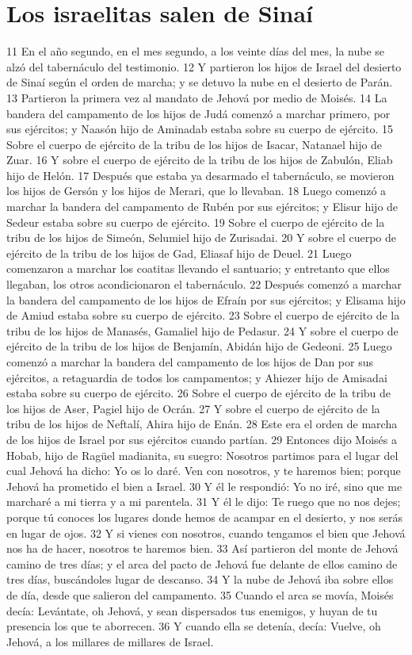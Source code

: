 \section*{Los israelitas salen de Sinaí}

11 En el año segundo, en el mes segundo, a los veinte días del mes, la nube se alzó del tabernáculo del testimonio.
12 Y partieron los hijos de Israel del desierto de Sinaí según el orden de marcha; y se detuvo la nube en el desierto de Parán.
13 Partieron la primera vez al mandato de Jehová por medio de Moisés.
14 La bandera del campamento de los hijos de Judá comenzó a marchar primero, por sus ejércitos; y Naasón hijo de Aminadab estaba sobre su cuerpo de ejército.
15 Sobre el cuerpo de ejército de la tribu de los hijos de Isacar, Natanael hijo de Zuar.
16 Y sobre el cuerpo de ejército de la tribu de los hijos de Zabulón, Eliab hijo de Helón.
17 Después que estaba ya desarmado el tabernáculo, se movieron los hijos de Gersón y los hijos de Merari, que lo llevaban.
18 Luego comenzó a marchar la bandera del campamento de Rubén por sus ejércitos; y Elisur hijo de Sedeur estaba sobre su cuerpo de ejército.
19 Sobre el cuerpo de ejército de la tribu de los hijos de Simeón, Selumiel hijo de Zurisadai.
20 Y sobre el cuerpo de ejército de la tribu de los hijos de Gad, Eliasaf hijo de Deuel.
21 Luego comenzaron a marchar los coatitas llevando el santuario; y entretanto que ellos llegaban, los otros acondicionaron el tabernáculo.
22 Después comenzó a marchar la bandera del campamento de los hijos de Efraín por sus ejércitos; y Elisama hijo de Amiud estaba sobre su cuerpo de ejército.
23 Sobre el cuerpo de ejército de la tribu de los hijos de Manasés, Gamaliel hijo de Pedasur.
24 Y sobre el cuerpo de ejército de la tribu de los hijos de Benjamín, Abidán hijo de Gedeoni.
25 Luego comenzó a marchar la bandera del campamento de los hijos de Dan por sus ejércitos, a retaguardia de todos los campamentos; y Ahiezer hijo de Amisadai estaba sobre su cuerpo de ejército.
26 Sobre el cuerpo de ejército de la tribu de los hijos de Aser, Pagiel hijo de Ocrán.
27 Y sobre el cuerpo de ejército de la tribu de los hijos de Neftalí, Ahira hijo de Enán.
28 Este era el orden de marcha de los hijos de Israel por sus ejércitos cuando partían.
29 Entonces dijo Moisés a Hobab, hijo de Ragüel madianita, su suegro: Nosotros partimos para el lugar del cual Jehová ha dicho: Yo os lo daré. Ven con nosotros, y te haremos bien; porque Jehová ha prometido el bien a Israel.
30 Y él le respondió: Yo no iré, sino que me marcharé a mi tierra y a mi parentela.
31 Y él le dijo: Te ruego que no nos dejes; porque tú conoces los lugares donde hemos de acampar en el desierto, y nos serás en lugar de ojos.
32 Y si vienes con nosotros, cuando tengamos el bien que Jehová nos ha de hacer, nosotros te haremos bien.
33 Así partieron del monte de Jehová camino de tres días; y el arca del pacto de Jehová fue delante de ellos camino de tres días, buscándoles lugar de descanso.
34 Y la nube de Jehová iba sobre ellos de día, desde que salieron del campamento.
35 Cuando el arca se movía, Moisés decía: Levántate, oh Jehová, y sean dispersados tus enemigos, y huyan de tu presencia los que te aborrecen.
36 Y cuando ella se detenía, decía: Vuelve, oh Jehová, a los millares de millares de Israel.

